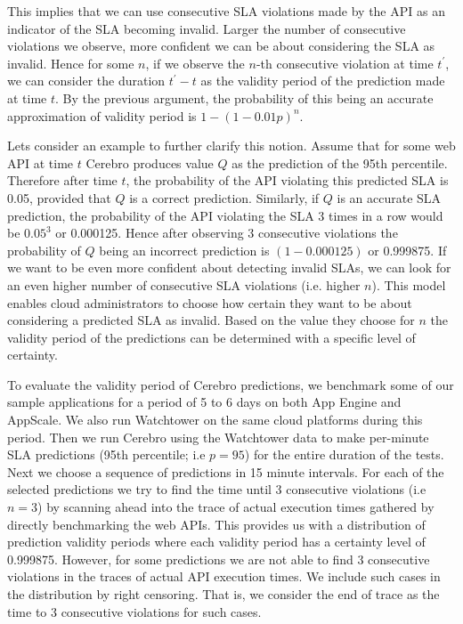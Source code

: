 This implies that we can use consecutive SLA violations made by the API as an indicator of the SLA becoming
invalid. Larger the number of consecutive violations we observe, more confident we can be about considering the SLA as invalid. 
Hence for some $n$, if we observe
the $n$-th consecutive violation at time $t^\prime$, we can consider the duration $t^\prime - t$ as the validity period of the prediction made 
at time $t$. By the previous argument, the probability of this being an accurate approximation of validity period is $1 - (1-0.01p)^n$.

Lets consider an example to further clarify this notion. Assume that for some web API at time $t$ Cerebro produces value $Q$ as the 
prediction of the 95th percentile. Therefore after time $t$, the probability of the API violating this predicted SLA is 0.05, provided
that $Q$ is a correct prediction. Similarly, if $Q$ is an accurate SLA prediction, the probability of the API
violating the SLA 3 times in a row would be $0.05^3$ or 0.000125. Hence after observing 3 consecutive violations the probability of $Q$
being an incorrect prediction is $(1 - 0.000125)$ or 0.999875. If we want to be even more confident about detecting invalid SLAs, 
we can look for an even higher
number of consecutive SLA violations (i.e. higher $n$). This model enables cloud administrators to choose how certain they want to be about
considering a predicted SLA as invalid. Based on the value they choose for $n$ the validity period of the predictions can be determined
with a specific level of certainty.

To evaluate the validity period of Cerebro predictions, we benchmark some of our sample applications for a period of 5 to 6 days on both
App Engine and AppScale. We also run Watchtower on the same cloud platforms during this period. Then we run Cerebro using
the Watchtower data to make per-minute SLA predictions (95th percentile; i.e $p=95$) for the entire duration of the tests. Next we choose a sequence of predictions
in 15 minute intervals. For each of the selected predictions we try to find the time until 3 consecutive violations (i.e $n=3$) by scanning ahead into the trace of
actual execution times gathered by directly benchmarking the web APIs. This provides us with a distribution of prediction validity periods where
each validity period has a certainty level of 0.999875.
However, for some predictions we are not able to find 3 consecutive violations in the traces of actual API execution times. We include
such cases in the distribution by right censoring. That is, we consider the end of trace as the time to 3 consecutive violations for such cases.

